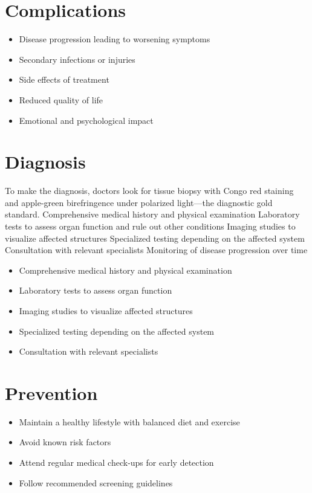 \section{Complications}
\begin{itemize}[noitemsep]
  \item Disease progression leading to worsening symptoms
  \item Secondary infections or injuries
  \item Side effects of treatment
  \item Reduced quality of life
  \item Emotional and psychological impact
\end{itemize}
\section{Diagnosis}
To make the diagnosis, doctors look for tissue biopsy with Congo red staining and apple-green birefringence under polarized light---the diagnostic gold standard. Comprehensive medical history and physical examination Laboratory tests to assess organ function and rule out other conditions Imaging studies to visualize affected structures Specialized testing depending on the affected system Consultation with relevant specialists Monitoring of disease progression over time

\begin{itemize}[noitemsep]
  \item Comprehensive medical history and physical examination
  \item Laboratory tests to assess organ function
  \item Imaging studies to visualize affected structures
  \item Specialized testing depending on the affected system
  \item Consultation with relevant specialists
\end{itemize}
\section{Prevention}
\begin{itemize}[noitemsep]
  \item Maintain a healthy lifestyle with balanced diet and exercise
  \item Avoid known risk factors
  \item Attend regular medical check-ups for early detection
  \item Follow recommended screening guidelines
\end{itemize}
